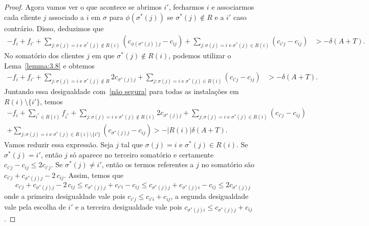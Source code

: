 \begin{proof}
    Agora vamos ver o que acontece se abrimos $i'$, fecharmos $i$ e associarmos cada cliente $j$ associado a $i$ em $\sigma$ para $\phi(\sigma^*(j))$ se $\sigma^*(j) \not \in R$ e a $i'$ caso contrário. Disso, deduzimos que
    \begin{align*}
        - f_i + f_{i'} + \sum_{j: \sigma(j) = i \text{ e } \sigma^*(j)\not \in R(i)}(c_{\phi(\sigma^*(j))j} - c_{ij}) + \sum_{j: \sigma(j)=i \text{ e }\sigma^*(j) \in R(i)}(c_{i'j} - c_{ij}) &> -\delta(A+T).
    \end{align*}
    No somatório dos clientes $j$ em que $\sigma^*(j) \not \in R(i)$, podemos utilizar o Lema~\ref{lemma:3.8} e obtemos
    \begin{align*}
        - f_i + f_{i'} + \sum_{j: \sigma(j) = i \text{ e } \sigma^*(j)\not \in R} 2c_{\sigma^*(j)j} + \sum_{j: \sigma(j)=i \text{ e }\sigma^*(j) \in R(i)}(c_{i'j} - c_{ij}) &> -\delta(A+T).
    \end{align*}
    Juntando essa desigualdade com~\eqref{não segura} para todas as instalações em $R(i)\setminus\{i'\}$, temos
    \begin{align*}
        -f_i + \sum_{i^* \in R(i)}f_{i^*} + \sum_{j: \sigma(j) = i \text{ e } \sigma^*(j)\not \in R(i)} 2c_{\sigma^*(j)j} + \sum_{j: \sigma(j)=i \text{ e }\sigma^*(j) \in R(i)}(c_{i'j} - c_{ij}) \\+ \sum_{j:\sigma(j)=i \text{ e }\sigma^*(j) \in R(i) \setminus\{i'\}}(c_{\sigma^*(j)j} - c_{ij}) > -|R(i)|\delta(A+T).
    \end{align*}
    Vamos reduzir essa expressão. Seja $j$ tal que $\sigma(j)=i$ e $\sigma^*(j) \in R(i)$. 
    Se $\sigma^*(j) = i'$, então $j$ só aparece no terceiro somatório e certamente $c_{i'j} - c_{ij} \leq 2 c_{i'j}$. 
    Se $\sigma^*(j)\neq i'$, então os termos referentes a $j$ no somatório são $c_{i'j} + c_{\sigma^*(j)j} - 2 \,c_{ij}$. Assim, temos que
    \[
            c_{i'j} + c_{\sigma^*(j)j} - 2 \,c_{ij} \leq 
            c_{\sigma^*(j)j} + c_{i'i} - c_{ij} \leq
            c_{\sigma^*(j)j} + c_{\sigma^*(j)i} - c_{ij} \leq
            2 c_{\sigma^*(j)j}
    \]
    onde a primeira desigualdade vale pois $c_{i'j} \leq c_{i'i} + c_{ij}$, a segunda desigualdade vale pela escolha de $i'$ e a terceira desigualdade vale pois $c_{\sigma^*(j)i} \leq c_{\sigma^*(j)j} + c_{ij}$.


\end{proof}
